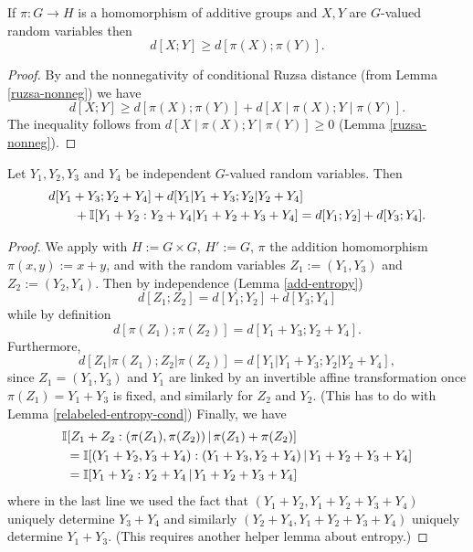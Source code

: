 \begin{corollary}\label{fibring-ineq}
  \leanok
If $\pi:G\to H$ is a homomorphism of additive groups and $X,Y$ are $G$-valued random variables then
\[d[X;Y]\geq d[\pi(X);\pi(Y)].\]
\end{corollary}

\begin{proof}
\leanok
By  and the nonnegativity of conditional Ruzsa distance (from Lemma \ref{ruzsa-nonneg}) we have
\[d[X;Y]\geq d[\pi(X);\pi(Y)]+d[X\mid \pi(X);Y\mid \pi(Y)].\]
The inequality follows from $d[X\mid \pi(X);Y\mid \pi(Y)]\geq 0$ (Lemma \ref{ruzsa-nonneg}).
\end{proof}


\begin{corollary}\label{cor-fibre}
  \leanok
  Let $Y_1,Y_2,Y_3$ and $Y_4$ be independent $G$-valued random variables.
  Then
\begin{align*}
  & d[Y_1+Y_3; Y_2+Y_4] + d[Y_1|Y_1+Y_3; Y_2|Y_2+Y_4] \\
  &\qquad + \mathbb{I}[Y_1+Y_2 : Y_2 + Y_4 | Y_1+Y_2+Y_3+Y_4] = d[Y_1; Y_2] + d[Y_3; Y_4].
\end{align*}
\end{corollary}

\begin{proof}
  \leanok
  We apply  with $H := G \times G$, $H' := G$, $\pi$ the addition homomorphism $\pi(x,y) := x+y$, and with the random variables $Z_1 := (Y_1,Y_3)$ and $Z_2 := (Y_2,Y_4)$.  Then by independence (Lemma \ref{add-entropy})
\[
  d[Z_1; Z_2] = d[Y_1; Y_2] + d[Y_3; Y_4]
\]
while by definition
\[
  d[\pi(Z_1); \pi(Z_2)] = d[Y_1+Y_3; Y_2+Y_4].
\]
Furthermore,
\[
  d[Z_1|\pi(Z_1); Z_2|\pi(Z_2)] = d[Y_1|Y_1+Y_3;Y_2|Y_2+Y_4],
\]
since $Z_1=(Y_1,Y_3)$ and $Y_1$ are linked by an invertible affine transformation once $\pi(Z_1)=Y_1+Y_3$ is fixed, and similarly for $Z_2$ and $Y_2$.  (This has to do with Lemma \ref{relabeled-entropy-cond})
Finally, we have
\begin{align*}
  &\mathbb{I}[Z_1 + Z_2 : (\pi(Z_1),\pi(Z_2)) \,|\, \pi(Z_1) + \pi(Z_2)] \\
  &\ = \mathbb{I}[(Y_1+Y_2, Y_3+Y_4) : (Y_1+Y_3, Y_2+Y_4) \,|\, Y_1+Y_2+Y_3+Y_4] \\
  &\ = \mathbb{I}[Y_1+Y_2 : Y_2+Y_4 \,|\, Y_1+Y_2+Y_3+Y_4]
\end{align*}
where in the last line we used the fact that $(Y_1+Y_2, Y_1+Y_2+Y_3+Y_4)$ uniquely determine $Y_3+Y_4$ and similarly
$(Y_2+Y_4, Y_1+Y_2+Y_3+Y_4)$ uniquely determine $Y_1+Y_3$.  (This requires another helper lemma about entropy.)
\end{proof}
